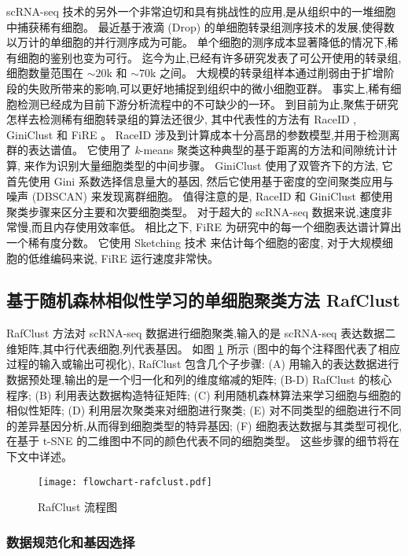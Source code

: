 scRNA-seq 技术的另外一个非常迫切和具有挑战性的应用,是从组织中的一堆细胞中捕获稀有细胞。
最近基于液滴 (Drop) 的单细胞转录组测序技术的发展,使得数以万计的单细胞的并行测序成为可能。
单个细胞的测序成本显著降低的情况下,稀有细胞的鉴别也变为可行。
迄今为止,已经有许多研究发表了可公开使用的转录组,细胞数量范围在 ${\sim} 20$k 和 ${\sim} 70$k 之间。
大规模的转录组样本通过削弱由于扩增阶段的失败所带来的影响,可以更好地捕捉到组织中的微小细胞亚群。
事实上,稀有细胞检测已经成为目前下游分析流程中的不可缺少的一环。
到目前为止,聚焦于研究怎样去检测稀有细胞转录组的算法还很少,
其中代表性的方法有 RaceID , GiniClust  和 FiRE 。
RaceID 涉及到计算成本十分高昂的参数模型,并用于检测离群的表达谱值。
它使用了 \textit{k}-means 聚类这种典型的基于距离的方法和间隙统计计算,
来作为识别大量细胞类型的中间步骤。
 GiniClust 使用了双管齐下的方法,
它首先使用 Gini 系数选择信息量大的基因,
然后它使用基于密度的空间聚类应用与噪声 (DBSCAN)  来发现离群细胞。
值得注意的是, RaceID 和 GiniClust 都使用聚类步骤来区分主要和次要细胞类型。
对于超大的 scRNA-seq 数据来说,速度非常慢,而且内存使用效率低。
相比之下, FiRE 为研究中的每一个细胞表达谱计算出一个稀有度分数。
它使用 Sketching 技术 来估计每个细胞的密度,
对于大规模细胞的低维编码来说, FiRE 运行速度非常快。

\subsection{基于随机森林相似性学习的单细胞聚类方法 RafClust}
\label{sec:method}

RafClust 方法对 scRNA-seq 数据进行细胞聚类,输入的是 scRNA-seq 表达数据二维矩阵,其中行代表细胞,列代表基因。
如图 \ref{fig:rafclust} 所示 (图中的每个注释图代表了相应过程的输入或输出可视化), RafClust 包含几个子步骤: 
(A) 用输入的表达数据进行数据预处理,输出的是一个归一化和列的维度缩减的矩阵;
(B-D) RafClust 的核心程序;
(B) 利用表达数据构造特征矩阵;
(C) 利用随机森林算法来学习细胞与细胞的相似性矩阵;
(D) 利用层次聚类来对细胞进行聚类;
(E) 对不同类型的细胞进行不同的差异基因分析,从而得到细胞类型的特异基因;
(F) 细胞表达数据与其类型可视化,在基于 t-SNE 的二维图中不同的颜色代表不同的细胞类型。
这些步骤的细节将在下文中详述。
\begin{figure}[!htbp]
    \centering
    \texttt{[image: flowchart-rafclust.pdf]}
    \caption{RafClust 流程图
    }
    \label{fig:rafclust}
\end{figure}

\subsubsection{数据规范化和基因选择}
\label{subsec:datapreprocessing} 

